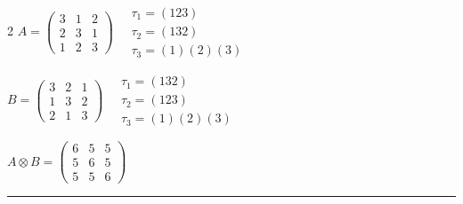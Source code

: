 \begin{multicols}{2}
$A = \begin{pmatrix} 3 & 1 & 2 \\ 2 & 3 & 1 \\ 1 & 2 & 3 \end{pmatrix} \quad \begin{matrix} \tau_{1}=(1 2 3) \\ \tau_{2}=(1 3 2) \\ \tau_{3}=(1)(2)(3) \end{matrix}$

$B = \begin{pmatrix} 3 & 2 & 1 \\ 1 & 3 & 2 \\ 2 & 1 & 3 \end{pmatrix} \quad \begin{matrix} \tau_{1}=(1 3 2) \\ \tau_{2}=(1 2 3) \\ \tau_{3}=(1)(2)(3) \end{matrix}$

$A \otimes B = \begin{pmatrix} 6 & 5 & 5 \\ 5 & 6 & 5 \\ 5 & 5 & 6 \end{pmatrix}$

\vspace{0.3em}
\hrule
\vspace{0.3em}

\end{multicols}